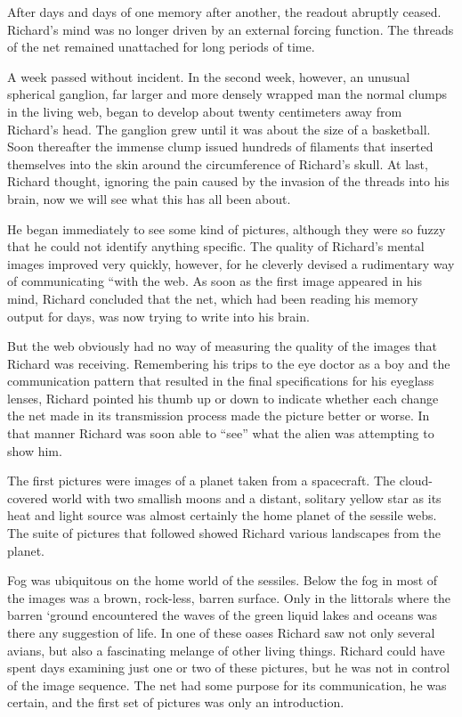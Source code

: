 \documentclass[]{article}
\begin{document}
{{After days and days of one memory after another, the readout abruptly ceased.  Richard’s mind was no longer driven by an external forcing function.  The threads of the net remained unattached for long periods of time.

A week passed without incident.  In the second week, however, an unusual spherical ganglion, far larger and more densely wrapped man the normal clumps in the living web, began to develop about twenty centimeters away from Richard’s head.  The ganglion grew until it was about the size of a basketball.  Soon thereafter the immense clump issued hundreds of filaments that inserted themselves into the skin around the circumference of Richard’s skull.  At last, Richard thought, ignoring the pain caused by the invasion of the threads into his brain, now we will see what this has all been about.

He began immediately to see some kind of pictures, although they were so fuzzy that he could not identify anything specific.  The quality of Richard’s mental images improved very quickly, however, for he cleverly devised a rudimentary way of communicating “with the web.  As soon as the first image appeared in his mind, Richard concluded that the net, which had been reading his memory output for days, was now trying to write into his brain.

But the web obviously had no way of measuring the quality of the images that Richard was receiving.  Remembering his trips to the eye doctor as a boy and the communication pattern that resulted in the final specifications for his eyeglass lenses, Richard pointed his thumb up or down to indicate whether each change the net made in its transmission process made the picture better or worse.  In that manner Richard was soon able to “see” what the alien was attempting to show him.

The first pictures were images of a planet taken from a spacecraft.  The cloud-covered world with two smallish moons and a distant, solitary yellow star as its heat and light source was almost certainly the home planet of the sessile webs.  The suite of pictures that followed showed Richard various landscapes from the planet.

Fog was ubiquitous on the home world of the sessiles.  Below the fog in most of the images was a brown, rock-less, barren surface.  Only in the littorals where the barren ‘ground encountered the waves of the green liquid lakes and oceans was there any suggestion of life.  In one of these oases Richard saw not only several avians, but also a fascinating melange of other living things.  Richard could have spent days examining just one or two of these pictures, but he was not in control of the image sequence.  The net had some purpose for its communication, he was certain, and the first set of pictures was only an introduction.

}}
\end{document}
